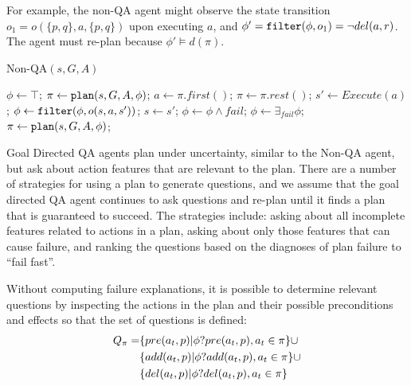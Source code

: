 \documentclass{article}
\begin{document}
For example, the non-QA agent might observe the state transition $o_1
= o(\{p,q\}, a, \{p,q\})$ upon executing $a$, and $\phi' = {\tt filter}(\phi,
o_1) = \neg del(a, r)$.  The agent must re-plan because $\phi' \models d(\pi)$.



\begin{algorithm}[t]
\caption{Non-QA$(s, G, {A})$}
\label{alg:replan}
  \begin{algorithmic}[1]
\STATE $\phi \leftarrow \top$; $\pi \leftarrow {\tt plan}(s, G, {A}, \phi)$;
\STATE $a \leftarrow \pi.first()$; $\pi \leftarrow \pi.rest()$;
\STATE $s ' \leftarrow Execute(a)$; 
\STATE $\phi \leftarrow {\tt filter}(\phi, o(s, a, s'))$; 
\STATE $s \leftarrow s'$; 
\ELSE 
\STATE  $\phi \leftarrow \phi \wedge fail$; 
 \ENDIF
\STATE  	 $\phi \leftarrow \exists_{fail}  \phi$;
\STATE  	 $\pi \leftarrow {\tt plan}(s, G, {A}, \phi)$;
 \ENDIF
\ENDWHILE
\end{algorithmic}
\end{algorithm}


Goal Directed QA agents plan under uncertainty, similar to
the Non-QA agent, but ask about action features that are relevant to the plan.
There are a number of strategies for using a plan to generate questions, and we assume
that the goal directed QA agent continues to ask questions and re-plan until it
finds a plan that is guaranteed to succeed. The strategies include: asking about
all incomplete features related to actions in a plan, asking about only those
features that can cause failure, and ranking the questions based on the
diagnoses of plan failure to ``fail fast''.

 Without computing failure explanations, it is
possible to determine relevant questions by inspecting the actions in the plan
and their possible preconditions and effects so that the set of questions is
defined:
\begin{align}
Q_{\pi} =&  \{pre(a_t, p) | \phi?pre(a_t, p), a_t \in \pi\}
\cup\notag\\ &\{add(a_t, p)| \phi?add(a_t, p), a_t \in \pi\} \cup\notag\\ 
&\{del(a_t,p)|\phi?del(a_t, p), a_t \in \pi\}\notag
\end{align}
\end{document}
